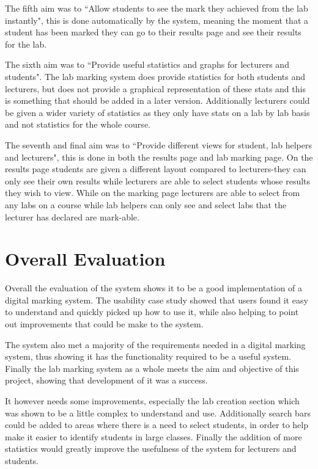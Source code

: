 \documentclass[11pt]{report}
\begin{document}
The fifth aim was to ``Allow students to see the mark they achieved from the lab instantly", this is done automatically by the system, meaning the moment that a student has been marked they can go to their results page and see their results for the lab.

The sixth aim was to ``Provide useful statistics and graphs for lecturers and students". The lab marking system does provide statistics for both students and lecturers, but does not provide a graphical representation of these stats and this is something that should be added in a later version. Additionally lecturers could be given a wider variety of statistics as they only have stats on a lab by lab basis and not statistics for the whole course.

The seventh and final aim was to ``Provide different views for student, lab helpers and lecturers", this is done in both the results page and lab marking page. On the results page students are given a different layout compared to lecturers-they can only see their own results while lecturers are able to select students whose results they wish to view. While on the marking page lecturers are able to select from any labs on a course while lab helpers can only see and select labs that the lecturer has declared are mark-able.



\section{Overall Evaluation}

Overall the evaluation of the system shows it to be a good implementation of a digital marking system. The usability case study showed that users found it easy to understand and quickly picked up how to use it, while also helping to point out improvements that could be make to the system.

The system also met a majority of the requirements needed in a digital marking system, thus showing it has the functionality required to be a useful system. Finally the lab marking system as a whole meets the aim and objective of this project, showing that development of it was a success.

It however needs some improvements, especially the lab creation section which was shown to be a little complex to understand and use. Additionally search bars could be added to areas where there is a need to select students, in order to help make it easier to identify students in large classes. Finally the addition of more statistics would greatly improve the usefulness of the system for lecturers and students.
\end{document}
